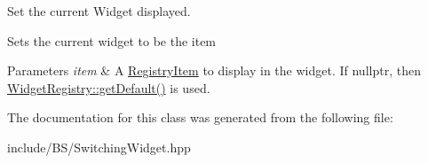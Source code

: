 Set the current Widget displayed. 

Sets the current widget to be the item 
\begin{DoxyParams}{Parameters}
{\em item} & A \hyperlink{class_registry_item}{Registry\+Item} to display in the widget. If nullptr, then \hyperlink{class_widget_registry_a0841639b77ada4dc770886fea9fef193}{Widget\+Registry\+::get\+Default()} is used. \\
\hline
\end{DoxyParams}


The documentation for this class was generated from the following file\+:\begin{DoxyCompactItemize}
\item 
include/\+B\+S/Switching\+Widget.\+hpp\end{DoxyCompactItemize}
